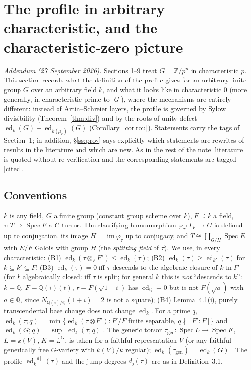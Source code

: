 \documentclass[11pt]{amsart}
\theoremstyle{definition}
\theoremstyle{remark}
\newcommand{\ed}{\operatorname{ed}}
\newcommand{\edd}[1]{\ed^{[#1]}}
\newcommand{\im}{\operatorname{im}}
\newcommand{\gen}{\mathrm{gen}}
\newcommand{\Z}{\mathbb Z}
\newcommand{\Q}{\mathbb Q}
\newcommand{\Gam}{\Gamma}
\begin{document}
\pagestyle{myheadings}

\section{The profile in arbitrary characteristic, and the characteristic-zero picture}

\noindent\textit{Addendum (27 September 2026).} Sections 1--9 treat $G=\Z/p^n$ in
characteristic $p$. This section records what the definition of the profile gives for
an arbitrary finite group $G$ over an arbitrary field $k$, and what it looks like in
characteristic $0$ (more generally, in characteristic prime to $|G|$), where the
mechanisms are entirely different: instead of Artin--Schreier layers, the profile is
governed by Sylow divisibility (Theorem~\ref{thm:div}) and by the roots-of-unity
defect $\ed_k(G)-\ed_{k(\mu_e)}(G)$ (Corollary~\ref{cor:rou}). Statements carry the
tags of Section~1; in addition, \S\ref{ss:prov} says explicitly which statements are
rewrites of results in the literature and which are new. As in the rest of the note,
literature is quoted without re-verification and the corresponding statements are
tagged [cited].

\subsection{Conventions}\label{ss:conv}
$k$ is any field, $G$ a finite group (constant group scheme over $k$), $F\supseteq k$
a field, $\tau\colon T\to\operatorname{Spec}F$ a $G$-torsor. The classifying
homomorphism $\varphi_\tau\colon\Gam_F\to G$ is defined up to conjugation, its image
$H=\im\varphi_\tau$ up to conjugacy, and $T\cong\coprod_{G/H}\operatorname{Spec}E$
with $E/F$ Galois with group $H$ (the \emph{splitting field} of $\tau$). We use, in
every characteristic: (B1) $\ed_k(\tau\otimes_FF')\le\ed_k(\tau)$; (B2)
$\ed_k(\tau)\ge\ed_{k'}(\tau)$ for $k\subseteq k'\subseteq F$; (B3) $\ed_k(\tau)=0$
iff $\tau$ descends to the algebraic closure of $k$ in $F$ (for $k$ algebraically
closed: iff $\tau$ is split; for general $k$ this is \emph{not} ``descends to $k$'':
$k=\Q$, $F=\Q(i)(t)$, $\tau=F(\sqrt{1+i})$ has $\ed_\Q=0$ but is not
$F(\sqrt a)$ with $a\in\Q$, since $N_{\Q(i)/\Q}(1+i)=2$ is not a square); (B4)
Lemma~4.1(i), purely transcendental base change does not change $\ed_k$. For a prime
$q$, $\ed_k(\tau;q)=\min\{\ed_k(\tau\otimes F'):F'/F\text{ finite separable},\
q\nmid[F':F]\}$ and $\ed_k(G;q)=\sup_\tau\ed_k(\tau;q)$ \cite[(2.5)]{RS}.
The generic torsor $\tau_\gen\colon\operatorname{Spec}L\to\operatorname{Spec}K$,
$L=k(V)$, $K=L^G$, is taken for a faithful representation $V$ (or any faithful
generically free $G$-variety with $k(V)/k$ regular); $\ed_k(\tau_\gen)=\ed_k(G)$
\cite{BF,Me}. The profile $\edd d_k(\tau)$ and the jump degrees $d_j(\tau)$ are as in
Definition~3.1.
\end{document}

